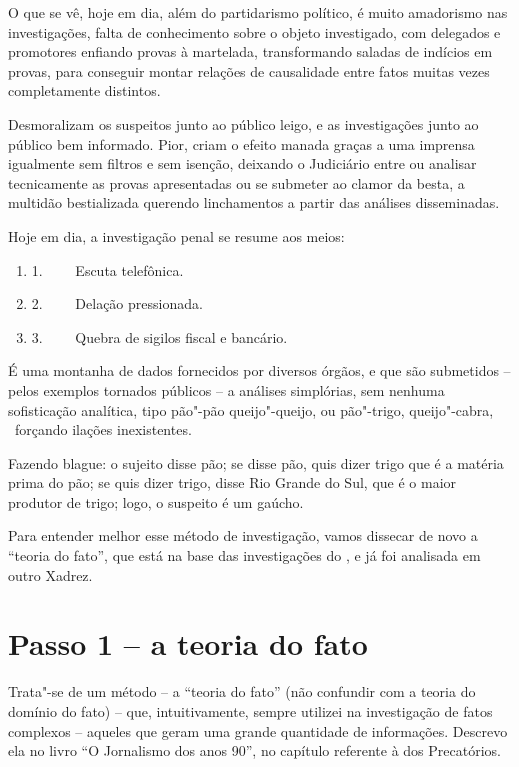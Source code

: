 O que se vê, hoje em dia, além do partidarismo político, é muito
amadorismo nas investigações, falta de conhecimento sobre o objeto
investigado, com delegados e promotores enfiando provas à martelada,
transformando saladas de indícios em provas, para conseguir montar
relações de causalidade entre fatos muitas vezes completamente
distintos.

Desmoralizam os suspeitos junto ao público leigo, e as investigações
junto ao público bem informado. Pior, criam o efeito manada graças a uma
imprensa igualmente sem filtros e sem isenção, deixando o Judiciário
entre ou analisar tecnicamente as provas apresentadas ou se submeter ao
clamor da besta, a multidão bestializada querendo linchamentos a partir
das análises disseminadas.

Hoje em dia, a investigação penal se resume aos meios:

\begin{enumerate}
\itemsep1pt\parskip0pt
\item
  1.~~~~ Escuta telefônica.
\item
  2.~~~~ Delação pressionada.
\item
  3.~~~~ Quebra de sigilos fiscal e bancário.
\end{enumerate}

É uma montanha de dados fornecidos por diversos órgãos, e que são
submetidos -- pelos exemplos tornados públicos -- a análises simplórias,
sem nenhuma sofisticação analítica, tipo pão"-pão queijo"-queijo, ou
pão"-trigo, queijo"-cabra, ~forçando ilações inexistentes.

Fazendo blague: o sujeito disse pão; se disse pão, quis dizer trigo que
é a matéria prima do pão; se quis dizer trigo, disse Rio Grande do Sul,
que é o maior produtor de trigo; logo, o suspeito é um gaúcho.

Para entender melhor esse método de investigação, vamos dissecar de novo
a ``teoria do fato'', que está na base das investigações do , e já
foi analisada em outro Xadrez.

\section{Passo 1 -- a teoria do fato}

Trata"-se de um método -- a ``teoria do fato'' (não confundir com a
teoria do domínio do fato) -- que, intuitivamente, sempre utilizei na
investigação de fatos complexos -- aqueles que geram uma grande
quantidade de informações. Descrevo ela no livro ``O Jornalismo dos anos
90'', no capítulo referente à  dos Precatórios.

